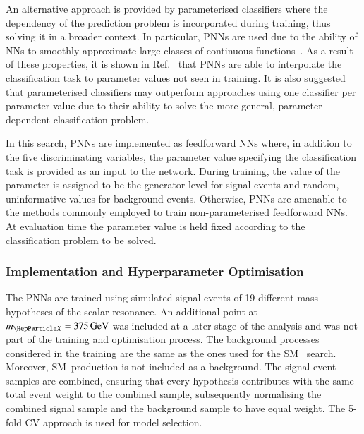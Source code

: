 An alternative approach is provided by parameterised classifiers where the
dependency of the prediction problem is incorporated during training, thus
solving it in a broader context. In particular, PNNs are used due to the ability
of NNs to smoothly approximate large classes of continuous
functions~\cite{Baldi:2016fzo}. As a result of these properties, it is shown in
Ref.~\cite{Baldi:2016fzo} that PNNs are able to interpolate the classification
task to parameter values not seen in training. It is also suggested that
parameterised classifiers may outperform approaches using one classifier per
parameter value due to their ability to solve the more general,
parameter-dependent classification problem.

In this search, PNNs are implemented as feedforward NNs
where, in addition to the five discriminating variables, the parameter
value specifying the classification task is provided as an input to
the network. During training, the value of the parameter is assigned
to be the generator-level \mX for signal events and random,
uninformative values for background events. Otherwise, PNNs are
amenable to the methods commonly employed to train non-parameterised
feedforward NNs. At evaluation time the parameter value is
held fixed according to the classification problem to be solved.


\subsubsection{Implementation and Hyperparameter Optimisation}

The PNNs are trained using simulated signal events of 19 different mass
hypotheses of the scalar resonance. An additional point at
$\mX = \SI{375}{\GeV}$ was included at a later stage of the analysis and was not
part of the training and optimisation process. The background processes
considered in the training are the same as the ones used for the SM~\HH
search. Moreover, SM~\HH production is not included as a background.
The signal event samples are combined, ensuring that every \mX hypothesis
contributes with the same total event weight to the combined sample,
subsequently normalising the combined signal sample and the background sample to
have equal weight. The 5-fold CV approach is used for model selection.

